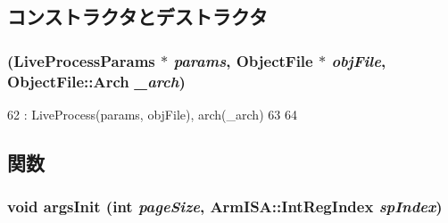 \subsection{コンストラクタとデストラクタ}
\hypertarget{classArmLiveProcess_a905a4ab86fb0bcc4d972b63b79939dad}{
\subsubsection[{ArmLiveProcess}]{ (LiveProcessParams $\ast$ {\em params}, \/  {\bf ObjectFile} $\ast$ {\em objFile}, \/  {\bf ObjectFile::Arch} {\em \_\-arch})}}
\label{classArmLiveProcess_a905a4ab86fb0bcc4d972b63b79939dad}



\begin{DoxyCode}
62     : LiveProcess(params, objFile), arch(_arch)
63 {
64 }
\end{DoxyCode}


\subsection{関数}
\hypertarget{classArmLiveProcess_a5dfec1d2426044bb04b75e1d2ba37b71}{
\subsubsection[{argsInit}]{\setlength{\rightskip}{0pt plus 5cm}void argsInit (int {\em pageSize}, \/  {\bf ArmISA::IntRegIndex} {\em spIndex})}}
\label{classArmLiveProcess_a5dfec1d2426044bb04b75e1d2ba37b71}




